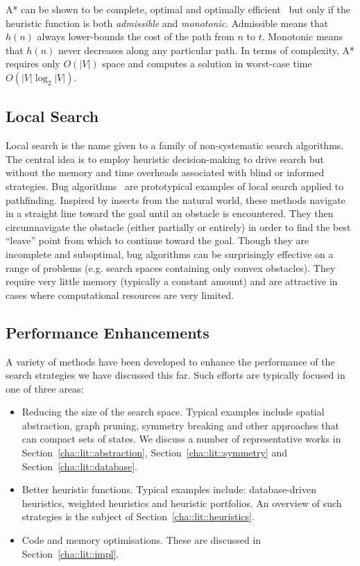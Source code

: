 A* can be shown to be complete, optimal and optimally
efficient~\citep{dechter85} but only if the heuristic function is both
\emph{admissible} and \emph{monotonic}. Admissible means that $h(n)$ always
lower-bounds the cost of the path from $n$ to $t$. Monotonic means that $h(n)$
never decreases along any particular path.
In terms of complexity, A* requires only $O(|V|)$ space and computes a solution in 
worst-case time $O(|V|\log_2{|V|})$.

\subsection{Local Search}
\label{cha::lit::search::local}
Local search is the name given to a family of non-systematic search algorithms.
The central idea is to employ heuristic decision-making to drive search but 
without the memory and time overheads associated with blind or informed strategies.
Bug algorithms~\citep{choset05} are prototypical examples of local search
applied to pathfinding.
Inspired by insects from the natural world, these methods navigate in a straight 
line toward the goal until an obstacle is encountered. They then circumnavigate 
the obstacle (either partially or entirely) in order to find the best ``leave'' 
point from which to continue toward the goal.
Though they are incomplete and suboptimal, bug algorithms can be surprisingly
effective on a range of problems (e.g. search spaces containing only convex
obstacles). They require very little memory (typically a constant amount) and
are attractive in cases where computational resources are very limited.

\subsection{Performance Enhancements}
\label{cha::lit::search::impl}
A variety of methods have been developed to enhance the performance of the
search strategies we have discussed this far. Such efforts are typically focused
in one of three areas:

\begin{itemize}
\item Reducing the size of the search space.
Typical examples include spatial abstraction, graph pruning, 
symmetry breaking and other approaches that can compact sets of states.
We discuss a number of representative works in Section~\ref{cha::lit::abstraction}, 
Section~\ref{cha::lit::symmetry} and Section~\ref{cha::lit::database}.

\item Better heuristic functions.
Typical examples include: database-driven heuristics, weighted heuristics and 
heuristic portfolios. An overview of such strategies is the subject of 
Section~\ref{cha::lit::heuristics}.

\item Code and memory optimisations. These are discussed in 
Section~\ref{cha::lit::impl}.
\end{itemize}

